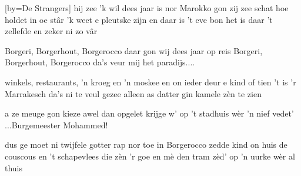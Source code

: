 [by={De Strangers}]
\beginverse
hij zee 'k wil dees jaar is nor Marokko gon
zij zee schat hoe holdet in oe st\^ar
'k weet e pleutske zijn en daar is 't eve bon
het is daar 't zellefde en zeker ni zo v\^ar
\endverse

\beginchorus
Borgeri, Borgerhout, Borgerocco
daar gon wij dees jaar op reis
Borgeri, Borgerhout, Borgerocco
da's veur mij het paradijs....
\endchorus

\beginsong
winkels, restaurants, 'n kroeg en 'n moskee
en on ieder deur e kind of tien
't is 'r Marrakesch da's ni te veul gezee
alleen as datter gin kamele z\`en te zien
\endsong

\beginverse
a ze meuge gon kieze awel dan opgelet
krijge w' op 't stadhuis w\`er 'n nief vedet' ...Burgemeester Mohammed!

dus ge moet ni twijfele gotter rap nor toe
in Borgerocco zedde kind on huis
de couscous en 't schapevlees die z\`en 'r goe
en m\`e den tram z\`ed' op 'n uurke w\`er al thuis
\endverse

\endsong
